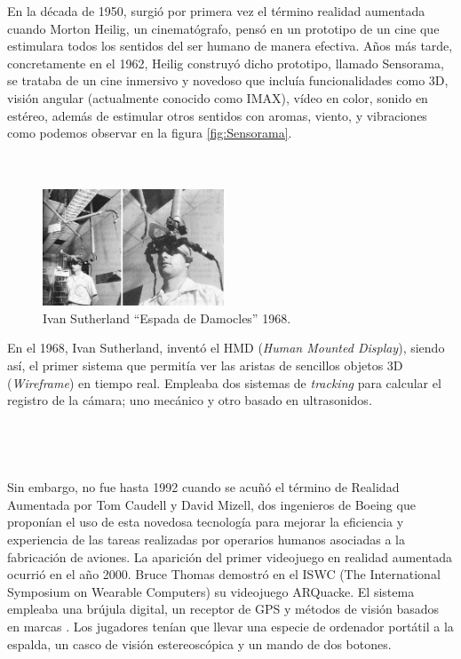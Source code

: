 En la década de 1950, surgió por primera vez el término realidad aumentada cuando Morton Heilig, un cinematógrafo, pensó en un prototipo de un cine que estimulara todos los sentidos del ser humano de manera efectiva. Años más tarde, concretamente en el 1962, Heilig construyó dicho prototipo, llamado Sensorama, se trataba de un cine inmersivo y novedoso que incluía funcionalidades como 3D, visión angular (actualmente conocido como IMAX), vídeo en color, sonido en estéreo, además de estimular otros sentidos con aromas, viento, y vibraciones como podemos observar en la figura \ref{fig:Sensorama}.\\
\\
\\

\begin{figure}
    \centering
    \includegraphics[width=0.48\textwidth]{Images/HumanMountDisplay.png}
    \caption{Ivan Sutherland “Espada de Damocles” 1968.}
    \label{fig:EspadaDamocles}
\end{figure}

En el 1968, Ivan Sutherland, inventó el HMD (\textit{Human Mounted Display}), siendo así, el primer sistema que permitía ver las aristas de sencillos objetos 3D (\textit{Wireframe}) en tiempo real. Empleaba dos sistemas de \textit{tracking} para calcular el registro de la cámara; uno mecánico y otro basado en ultrasonidos.\\
\\
\\
\\
\\


Sin embargo, no fue hasta 1992 cuando se acuñó el término de Realidad Aumentada por Tom Caudell y David Mizell, dos ingenieros de Boeing que proponían el uso de esta novedosa tecnología para mejorar la eficiencia y experiencia de las tareas realizadas por operarios humanos asociadas a la fabricación de aviones.
La aparición del primer videojuego en realidad aumentada ocurrió en el año 2000. Bruce Thomas demostró en el ISWC (The International Symposium on Wearable Computers) su videojuego ARQuacke. El sistema empleaba una brújula digital, un receptor de GPS y métodos de visión basados en marcas \cite{ARToolkit}. Los jugadores tenían que llevar una especie de ordenador portátil a la espalda, un casco de visión estereoscópica y un mando de dos botones.\cite{ARQuake}


